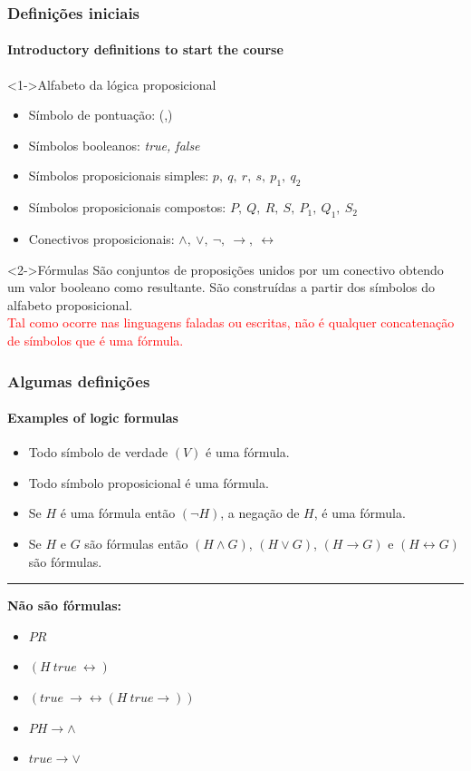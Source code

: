 \documentclass[10pt]{beamer}
\begin{document}
%
\begin{frame}[t]
    \frametitle{Definições iniciais}
    \framesubtitle{Introductory definitions to start the course}
    \begin{block}<1->{Alfabeto da lógica proposicional}
        \begin{itemize}
            \item Símbolo de pontuação: (,)
            \item Símbolos booleanos: \textit{true, false}
            \item Símbolos proposicionais simples: $p,~q,~r,~s,~p_1,~q_2$
            \item Símbolos proposicionais compostos: $P,~Q,~R,~S,~P_1,~Q_1,~S_2$
            \item Conectivos proposicionais: $\land,~\lor,~\lnot,~\rightarrow, ~\leftrightarrow$
        \end{itemize}
    \end{block}
    \begin{block}<2->{Fórmulas}
        \quad São conjuntos de proposições unidos por um conectivo obtendo um valor booleano como resultante. São construídas a partir dos símbolos do alfabeto proposicional.\\
        \quad \textcolor{red}{Tal como ocorre nas linguagens faladas ou escritas, não é qualquer concatenação de símbolos que é uma fórmula.}
    \end{block}
\end{frame}
%
\begin{frame}[t]
    \pagecolor{black}
    \frametitle{Algumas definições}
    \framesubtitle{Examples of logic formulas}
        \begin{itemize}
            \item Todo símbolo de verdade $(V)$ é uma fórmula.
            \item Todo símbolo proposicional é uma fórmula.
            \item Se $H$ é uma fórmula então $(\lnot H)$, a negação de $H$, é uma fórmula.
            \item Se $H$ e $G$ são fórmulas então $(H \land G)$, $(H \lor G)$, $(H \rightarrow G)$ e $(H \leftrightarrow G)$ são fórmulas. 
        \end{itemize}
        {\color{blue} \rule{\linewidth}{1mm}}
        \pause
        \textbf{Não são fórmulas:}\\
        \begin{itemize}
            \item $PR$
            \item $(H~true~\leftrightarrow)$
            \item $(true~\rightarrow \leftrightarrow (H~true \rightarrow))$
            \item $PH \rightarrow \land$
            \item $true \rightarrow \lor$
        \end{itemize}
\end{frame}
%
\end{document}
